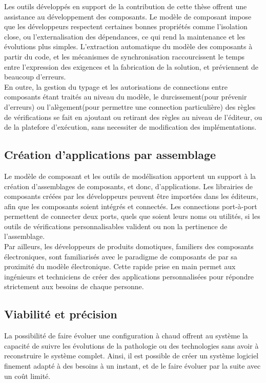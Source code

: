 Les outils développés en support de la contribution de cette thèse offrent une assistance au développement des composants. Le modèle de composant impose que les développeurs respectent certaines bonnes propriétés comme l'isolation close, ou l'externalisation des dépendances, ce qui rend la maintenance et les évolutions plus simples. L'extraction automatique du modèle des composants à partir du code, et les mécanismes de synchronisation raccourcissent le temps entre l'expression des exigences et la fabrication de la solution, et préviennent de beaucoup d'erreurs.\\
En outre, la gestion du typage et les autorisations de connections entre composants étant traités au niveau du modèle, le durcissement(pour prévenir d'erreurs) ou l'alègement(pour permettre une connection particulière) des règles de vérifications se fait en ajoutant ou retirant des règles au niveau de l'éditeur, ou de la platefore d'exécution, sans necessiter de modification des implémentations.	

\subsection{Création d'applications par assemblage}
Le modèle de composant et les outils de modélisation apportent un support à la création d'assemblages de composants, et donc, d'applications. Les librairies de composants créées par les développeurs peuvent être importées dans les éditeurs, afin que les composants soient intégrés et connectés. Les connections port-à-port permettent de connecter deux ports, quels que soient leurs noms ou utilités, si les outils de vérifications personnalisables valident ou non la pertinence de l'assemblage.\\
Par ailleurs, les développeurs de produits domotiques, familiers des composants électroniques, sont familiarisés avec le paradigme de composants de par sa proximité du modèle électronique. Cette rapide prise en main permet aux ingénieurs et techniciens de créer des applications personnalisées pour répondre strictement aux besoins de chaque personne.

\subsection{Viabilité et précision}
La possibilité de faire évoluer une configuration à chaud offrent au système la capacité de suivre les évolutions de la pathologie ou des technologies sans avoir à reconstruire le système complet. Ainsi, il est possible de créer un système logiciel finement adapté à des besoins à un instant, et de le faire évoluer par la suite avec un coût limité.


